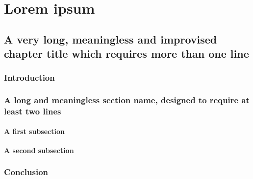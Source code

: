\part{Lorem ipsum}

\chapter[An optional shorter title for the toc and headers]{A very long, meaningless and improvised chapter title which requires more than one line}



\section{Introduction}

\lipsum[1-2]


\section{A long and meaningless section name, designed to require at least two lines}

\lipsum[3-4]


\subsection{A first subsection}

\lipsum[5-6]


\subsection{A second subsection}

\lipsum[7-8]


\section{Conclusion}

\lipsum[9-10]
